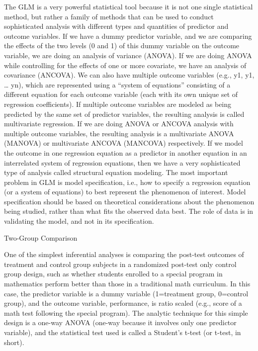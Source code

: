 The GLM is a very powerful statistical tool because it is not one single statistical method, but rather a family of methods that can be used to conduct sophisticated analysis with different types and quantities of predictor and outcome variables. If we have a dummy predictor variable, and we are comparing the effects of the two levels (0 and 1) of this dummy variable on the outcome variable, we are doing an analysis of variance (ANOVA). If we are doing ANOVA while controlling for the effects of one or more covariate, we have an analysis of covariance (ANCOVA). We can also have multiple outcome variables (e.g., y1, y1, … yn), which are represented using a “system of equations” consisting of a different equation for each outcome variable (each with its own unique set of regression coefficients). If multiple outcome variables are modeled as being predicted by the same set of predictor variables, the resulting analysis is called multivariate regression. If we are doing ANOVA or ANCOVA analysis with multiple outcome variables, the resulting analysis is a multivariate ANOVA (MANOVA) or multivariate ANCOVA (MANCOVA) respectively. If we model the outcome in one regression equation as a predictor in another equation in an interrelated system of regression equations, then we have a very sophisticated type of analysis called structural equation modeling. The most important problem in GLM is model specification, i.e., how to specify a regression equation (or a system of equations) to best represent the phenomenon of interest. Model specification should be based on theoretical considerations about the phenomenon being studied, rather than what fits the observed data best. The role of data is in validating the model, and not in its specification.

Two-Group Comparison

One of the simplest inferential analyses is comparing the post-test outcomes of treatment and control group subjects in a randomized post-test only control group design, such as whether students enrolled to a special program in mathematics perform better than those in a traditional math curriculum. In this case, the predictor variable is a dummy variable (1=treatment group, 0=control group), and the outcome variable, performance, is ratio scaled (e.g., score of a math test following the special program). The analytic technique for this simple design is a one-way ANOVA (one-way because it involves only one predictor variable), and the statistical test used is called a Student’s t-test (or t-test, in short). 

